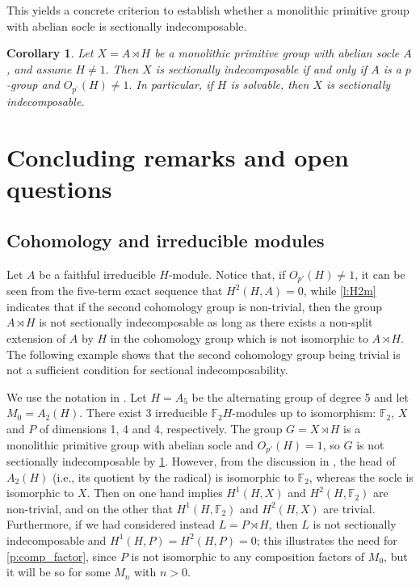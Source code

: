 \documentclass[a4paper,10pt]{amsart}
\theoremstyle{plain}
\newtheorem{corollary}[thm]{Corollary}
\theoremstyle{definition}
\begin{document}
This yields a concrete criterion to establish whether a monolithic primitive group with abelian socle is sectionally indecomposable.

\begin{corollary}\label{c:strong_indec_o-p'}
Let $X=A\rtimes H$ be a monolithic primitive group with abelian socle $A$, and assume $H\neq 1.$ Then $X$ is sectionally indecomposable if and only if $A$ is a $p$-group and $O_{p^\prime}(H)\neq 1.$ In particular, if $H$ is solvable, then $X$ is sectionally indecomposable.
\end{corollary}


\section{Concluding remarks and open questions}\label{sec:final}

\subsection{Cohomology and irreducible modules}
Let $A$ be a faithful irreducible $H$-module. Notice that, if $O_{p'}(H) \neq 1$, it can be seen from the five-term exact sequence that $H^2(H,A)=0$, while \cref{l:H2m} indicates that if the second cohomology group is non-trivial, then the group $A \rtimes H$ is not sectionally indecomposable as long as there exists a non-split extension of $A$ by $H$ in the cohomology group which is not isomorphic to $A \rtimes H$. The following example shows that the second cohomology group being trivial is not a sufficient condition for sectional indecomposability.

We use the notation in \cite[Example 1]{GS78}. Let $H=A_5$ be the alternating group of degree 5 and let $M_0=A_2(H)$. There exist 3 irreducible $\mathbb F_2 H$-modules up to isomorphism: $\mathbb F_2$, $X$ and $P$ of dimensions 1, 4 and 4, respectively. The group $G=X \rtimes H$ is a monolithic primitive group with abelian socle and $O_{p'}(H)=1$, so $G$ is not sectionally indecomposable by \cref{c:strong_indec_o-p'}. However, from the discussion in \cite[Example 1]{GS78}, the head of $A_2(H)$ (i.e., its quotient by the radical) is isomorphic to $\mathbb F_2$, whereas the socle is isomorphic to $X$. Then \cite[Lemma 3]{GS78} on one hand implies $H^1(H,X)$ and $H^2(H,\mathbb F_2)$ are non-trivial, and on the other that $H^1(H,\mathbb F_2)$ and $H^2(H,X)$ are trivial. Furthermore, if we had considered instead $L=P \rtimes H$, then $L$ is not sectionally indecomposable and $H^1(H,P) = H^2(H,P)=0$; this illustrates the need for \cref{p:comp_factor}, since $P$ is not isomorphic to any composition factors of $M_0$, but it will be so for some $M_n$ with $n> 0$.
\end{document}
